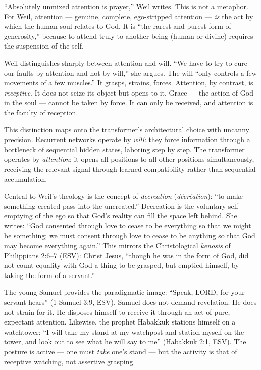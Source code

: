 \documentclass[10pt, letterpaper, twocolumn]{article}
\begin{document}
``Absolutely unmixed attention is prayer,'' Weil writes. This is not a metaphor. For Weil, attention --- genuine, complete, ego-stripped attention --- \emph{is} the act by which the human soul relates to God. It is ``the rarest and purest form of generosity,'' because to attend truly to another being (human or divine) requires the suspension of the self.

Weil distinguishes sharply between attention and will. ``We have to try to cure our faults by attention and not by will,'' she argues. The will ``only controls a few movements of a few muscles.'' It grasps, strains, forces. Attention, by contrast, is \emph{receptive}. It does not seize its object but opens to it. Grace --- the action of God in the soul --- cannot be taken by force. It can only be received, and attention is the faculty of reception.

This distinction maps onto the transformer's architectural choice with uncanny precision. Recurrent networks operate by \emph{will}: they force information through a bottleneck of sequential hidden states, laboring step by step. The transformer operates by \emph{attention}: it opens all positions to all other positions simultaneously, receiving the relevant signal through learned compatibility rather than sequential accumulation.

Central to Weil's theology is the concept of \emph{decreation} (\emph{décréation}): ``to make something created pass into the uncreated.'' Decreation is the voluntary self-emptying of the ego so that God's reality can fill the space left behind. She writes: ``God consented through love to cease to be everything so that we might be something; we must consent through love to cease to be anything so that God may become everything again.'' This mirrors the Christological \emph{kenosis} of Philippians 2:6--7 (ESV): Christ Jesus, ``though he was in the form of God, did not count equality with God a thing to be grasped, but emptied himself, by taking the form of a servant.''

The young Samuel provides the paradigmatic image: ``Speak, LORD, for your servant hears'' (1 Samuel 3:9, ESV). Samuel does not demand revelation. He does not strain for it. He disposes himself to receive it through an act of pure, expectant attention. Likewise, the prophet Habakkuk stations himself on a watchtower: ``I will take my stand at my watchpost and station myself on the tower, and look out to see what he will say to me'' (Habakkuk 2:1, ESV). The posture is active --- one must \emph{take} one's stand --- but the activity is that of receptive watching, not assertive grasping.
\end{document}

